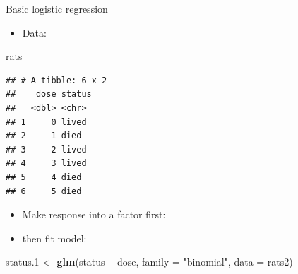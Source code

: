 \documentclass[ignorenonframetext,]{beamer}
\newenvironment{Shaded}{\begin{snugshade}}{\end{snugshade}}
\newcommand{\DataTypeTok}[1]{\textcolor[rgb]{0.13,0.29,0.53}{#1}}
\newcommand{\FloatTok}[1]{\textcolor[rgb]{0.00,0.00,0.81}{#1}}
\newcommand{\KeywordTok}[1]{\textcolor[rgb]{0.13,0.29,0.53}{\textbf{#1}}}
\newcommand{\NormalTok}[1]{#1}
\newcommand{\OperatorTok}[1]{\textcolor[rgb]{0.81,0.36,0.00}{\textbf{#1}}}
\newcommand{\StringTok}[1]{\textcolor[rgb]{0.31,0.60,0.02}{#1}}
\providecommand{\tightlist}{%
  \setlength{\itemsep}{0pt}\setlength{\parskip}{0pt}}
\begin{document}
\begin{frame}[fragile]{Basic logistic regression}
\protect\hypertarget{basic-logistic-regression}{}

\begin{itemize}
\tightlist
\item
  Data:
\end{itemize}

\begin{Shaded}
\begin{Highlighting}[]
\NormalTok{rats}
\end{Highlighting}
\end{Shaded}

\begin{verbatim}
## # A tibble: 6 x 2
##    dose status
##   <dbl> <chr> 
## 1     0 lived 
## 2     1 died  
## 3     2 lived 
## 4     3 lived 
## 5     4 died  
## 6     5 died
\end{verbatim}

\begin{itemize}
\tightlist
\item
  Make response into a factor first:
\end{itemize}

\begin{Shaded}
\end{Shaded}

\begin{itemize}
\tightlist
\item
  then fit model:
\end{itemize}

\begin{Shaded}
\begin{Highlighting}[]
\NormalTok{status}\FloatTok{.1}\NormalTok{ <-}
\StringTok{  }\KeywordTok{glm}\NormalTok{(status }\OperatorTok{~}\StringTok{ }\NormalTok{dose, }\DataTypeTok{family =} \StringTok{"binomial"}\NormalTok{, }\DataTypeTok{data =}\NormalTok{ rats2)}
\end{Highlighting}
\end{Shaded}

\end{frame}
\end{document}
